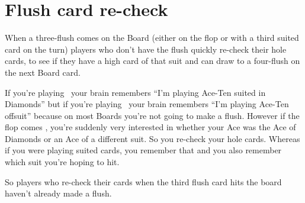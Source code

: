 \section{Flush card re-check}

When a three-flush comes on the Board (either on the flop or with
a third suited card on the turn) players who don't have the flush
quickly re-check their hole cards, to see if they have a high card
of that suit and can draw to a four-flush on the next Board card.

If you're playing \Ad\tend\ your brain remembers ``I'm playing Ace-Ten
suited in Diamonds'' but if you're playing \Ad\tens\ your brain remembers
``I'm playing Ace-Ten offsuit'' because on most Boards you're not going to
make a flush. However if the flop comes \Kd\eigd\sevd, you're suddenly
very interested in whether your Ace was the Ace of Diamonds or an Ace of
a different suit. So you re-check your hole cards. Whereas if you were
playing suited cards, you remember that and you also remember which suit
you're hoping to hit.

So players who re-check their cards when the third flush card hits the
board haven't already made a flush.
